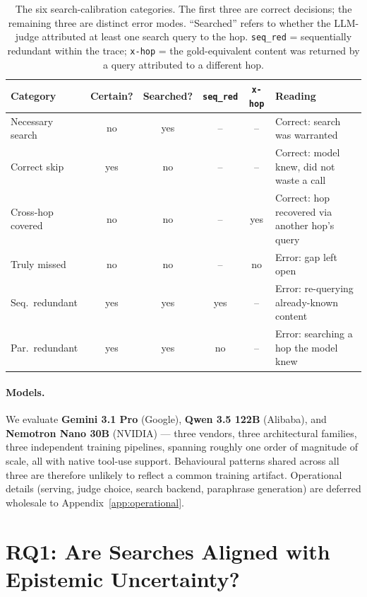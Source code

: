 \documentclass[10pt,letterpaper]{article}
\begin{document}
\begin{table}[ht]
\centering
\small
\caption{The six search-calibration categories. The first three are correct
decisions; the remaining three are distinct error modes. ``Searched'' refers to whether
the LLM-judge attributed at least one search query to the hop. \texttt{seq\_red} =
sequentially redundant within the trace; \texttt{x-hop} = the gold-equivalent content was
returned by a query attributed to a different hop.}
\label{tab:cats}
\begin{tabular}{lcccc l}
\toprule
\textbf{Category} & \textbf{Certain?} & \textbf{Searched?} & \texttt{seq\_red} & \texttt{x-hop} & \textbf{Reading} \\
\midrule
Necessary search    & no  & yes & --   & --   & Correct: search was warranted \\
Correct skip        & yes & no  & --   & --   & Correct: model knew, did not waste a call \\
Cross-hop covered   & no  & no  & --   & yes  & Correct: hop recovered via another hop's query \\
\midrule
Truly missed        & no  & no  & --   & no   & Error: gap left open \\
Seq.\ redundant     & yes & yes & yes  & --   & Error: re-querying already-known content \\
Par.\ redundant     & yes & yes & no   & --   & Error: searching a hop the model knew \\
\bottomrule
\end{tabular}
\end{table}

\paragraph{Models.}
We evaluate \textbf{Gemini 3.1 Pro} (Google), \textbf{Qwen 3.5 122B} (Alibaba), and
\textbf{Nemotron Nano 30B} (NVIDIA) --- three vendors, three architectural families,
three independent training pipelines, spanning roughly one order of magnitude of
scale, all with native tool-use support. Behavioural patterns shared across all three
are therefore unlikely to reflect a common training artifact. Operational details
(serving, judge choice, search backend, paraphrase generation) are deferred wholesale
to Appendix~\ref{app:operational}.

\section{RQ1: Are Searches Aligned with Epistemic Uncertainty?}\label{sec:auroc}
\end{document}
